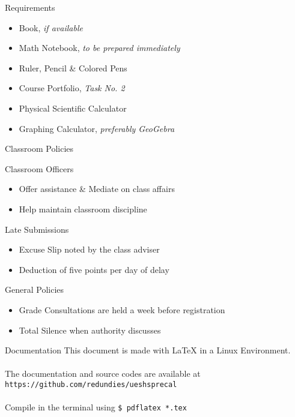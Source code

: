 \documentclass[14pt, aspectratio=169]{beamer}
\begin{document}
\begin{frame}{Requirements}
 \begin{itemize}
  \item Book, \textit{if available}
  \item Math Notebook, \textit{to be prepared immediately}
  \item Ruler, Pencil \& Colored Pens
  \item Course Portfolio, \textit{Task No. 2}
  \item Physical Scientific Calculator
  \item Graphing Calculator, \textit{preferably GeoGebra}
 \end{itemize}
\end{frame}

\begin{frame}{Classroom Policies}
 \begin{block}{Classroom Officers}
  \begin{itemize}
   \item Offer assistance \& Mediate on class affairs
   \item Help maintain classroom discipline
  \end{itemize}
 \end{block}

 \begin{block}{Late Submissions}
  \begin{itemize}
   \item Excuse Slip noted by the class adviser
   \item Deduction of five points per day of delay
  \end{itemize}
 \end{block}

 \begin{alertblock}{General Policies}
  \begin{itemize}
   \item Grade Consultations are held a week before registration
   \item Total Silence when authority discusses
  \end{itemize}
 \end{alertblock}
\end{frame}

\begin{frame}{Documentation}
 This document is made with {\textrm \LaTeX} in a Linux Environment. \\~\\
 The documentation and source codes are available at \\
 \texttt{https://github.com/redundies/ueshsprecal} \\~\\
 Compile in the terminal using
 \texttt{\$ pdflatex *.tex}
\end{frame}
\end{document}

